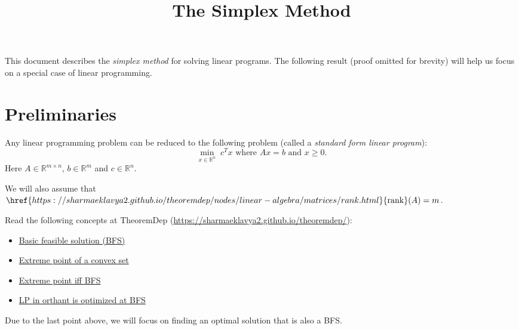 
\usepackage[shortlabels]{enumitem}


\newcommand*{\thmdepUrl}{https://sharmaeklavya2.github.io/theoremdep/nodes}
\newcommand*{\todotext}[1]{\textcolor{red}{#1}}
\newenvironment*{tightemize}{\begin{itemize}[noitemsep,topsep=0pt]}{\end{itemize}}
\renewcommand{\algorithmiccomment}[1]{\hfill\textcolor{gray}{\texttt{//} \textit{#1}}}

\newcommand*{\Jcomp}{\overline{J}}
\newcommand*{\bline}{\overline{b}}
\newcommand*{\btildline}{\overline{\btild}}
\DeclareMathOperator{\rank}{rank}
\DeclareMathOperator{\Span}{span}
\DeclareMathOperator{\solve}{\mathtt{solve}}
\DeclareMathOperator{\pivot}{\mathtt{pivot}}
\DeclareMathOperator{\assert}{\mathtt{assert}}
\DeclareMathOperator{\naiveSimplex}{\mathtt{naiveSimplex}}

\title{The Simplex Method}



\maketitle
\setlength{\parskip}{0.4em}

This document describes the \emph{simplex method} for solving linear programs.
The following result (proof omitted for brevity) will help us
focus on a special case of linear programming.

\section{Preliminaries}

\begin{theorem}
Any linear programming problem can be reduced to the following problem
(called a \emph{standard form linear program}):
\[ \min_{x \in \mathbb{R}^n}\; c^Tx \textrm{ where } Ax = b \textrm{ and } x \ge 0. \]
Here $A \in \mathbb{R}^{m \times n}$, $b \in \mathbb{R}^m$ and $c \in \mathbb{R}^n$.
\end{theorem}

We will also assume \wLoG{} that
$\href{https://sharmaeklavya2.github.io/theoremdep/nodes/linear-algebra/matrices/rank.html}{\rank}(A) = m$.

Read the following concepts at TheoremDep (\url{https://sharmaeklavya2.github.io/theoremdep/}):
\begin{tightemize}
\item \href{\thmdepUrl/convexity/polyhedra/bfs.html}{Basic feasible solution (BFS)}
\item \href{\thmdepUrl/convexity/extreme-point.html}{Extreme point of a convex set}
\item \href{\thmdepUrl/convexity/polyhedra/extreme-point-iff-bfs.html}{Extreme point iff BFS}
\item \href{\thmdepUrl/convexity/polyhedra/orth-lp.html}{LP in orthant is optimized at BFS}
\end{tightemize}
Due to the last point above, we will focus on finding an optimal solution that is also a BFS.

